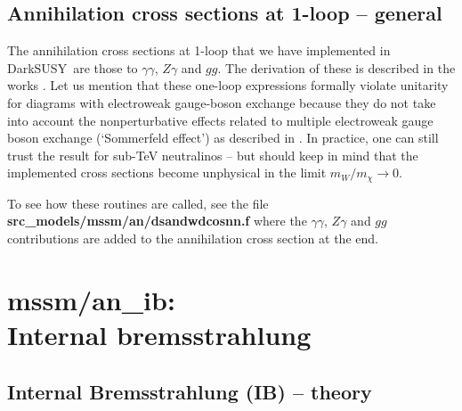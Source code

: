 \documentclass[a4paper,10pt,oneside]{book}
\newcommand{\codeb}[1]{\ftb{#1}}
\newcommand{\ds}{{\sffamily DarkSUSY}}
\newcommand{\ftb}[1]{{\bfseries \sffamily #1}}
\begin{document}

\subsection{Annihilation cross sections at 1-loop -- general }

The annihilation cross sections at 1-loop that we have implemented in
\ds\ are those to $\gamma \gamma$, $Z \gamma$ and $g g$. The
derivation of these is described in the works \cite{Bergstrom:1997fh,Ullio:1997ke}.
Let us mention that these one-loop expressions formally violate unitarity for diagrams
with electroweak gauge-boson exchange because they do not take into account the 
nonperturbative effects related to multiple electroweak gauge boson exchange (`Sommerfeld
effect') as described in \cite{Hisano:2003ec,Hisano:2004ds}. In practice, one can still trust 
the result for sub-TeV neutralinos -- but should keep in mind that the implemented cross 
sections become unphysical in the limit $m_W/m_\chi \to 0$.

To see how these routines are called, see the file
\codeb{src\_models/mssm/an/dsandwdcosnn.f} where the $\gamma \gamma$, $Z \gamma$
and $g g$ contributions are added to the annihilation cross section at
the end.

\section[mssm/an\_ib: Internal bremsstrahlung]{\codeb{mssm/an\_ib}:\\ Internal bremsstrahlung}
\label{sec:src_models/mssm/an_ib}

\subsection{Internal Bremsstrahlung (IB) -- theory}
\end{document}
